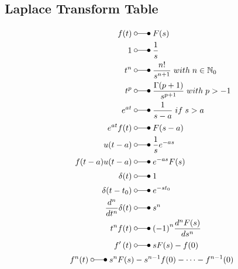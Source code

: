 \subsection{Laplace Transform Table}
\begin{align*}
    f(t)                            \;                      & \laplace\; F(s)                                                     \\
    1                               \;                      & \laplace\; \frac{1}{s}                                              \\
    t^{n}                           \;                      & \laplace\; \frac{n!}{s^{n+1}} \; with \; n \in \mathbb{N}_0         \\
    t^{p}                           \;                      & \laplace\; \frac{\Gamma(p+1)}{s^{p+1}} \; with \; p > -1            \\
    e^{at}                          \;                      & \laplace\; \frac{1}{s-a} \; if \; s>a \;                            \\
    e^{at}f(t)                      \;                      & \laplace\; F(s-a)                                                   \\
    u(t-a)                          \;                      & \laplace\; \frac{1}{s}e^{-as}                                       \\
    f(t-a)u(t-a)                    \;                      & \laplace\; e^{-as}F(s)                                              \\
    \delta(t)                       \;                      & \laplace\; 1                                                        \\
    \delta(t-t_{0})                 \;                      & \laplace\; e^{-st_{0}}                                              \\
    \frac{d^{n}}{dt^{n}}\delta(t)   \;                      & \laplace\; s^{n}                                                    \\
    t^{n}f(t)                       \;                      & \laplace\; {(-1)}^n \frac{d^{n}F(s)}{ds^n}                          \\
    f^{\prime}\left(t\right)        \;                      & \laplace\; \begin{aligned}sF(s)-f(0)\end{aligned}                   \\
    f^{n}(t)                        \; \laplace\; s^{n}F(s) & -s^{n-1}f(0)-\cdots-f^{n-1}(0)                                      \\

\end{align*}
